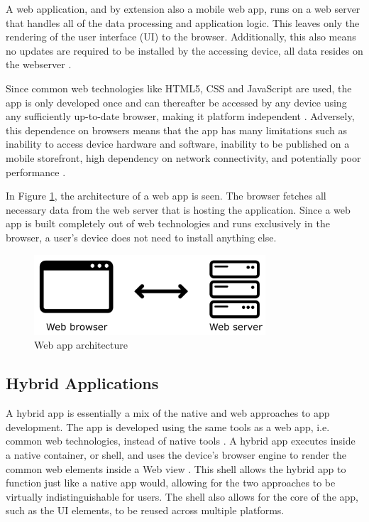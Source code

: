 \documentclass[a4paper,12pt]{article}
\begin{document}
A web application, and by extension also a mobile web app, runs on a web server that handles all of the data processing and application logic. This leaves only the rendering of the user interface (UI) to the browser. Additionally, this also means no updates are required to be installed by the accessing device, all data resides on the webserver \cite{crossplatform_taxonomy, crossplatform_2012}.

Since common web technologies like HTML5, CSS and JavaScript are used, the app is only developed once and can thereafter be accessed by any device using any sufficiently up-to-date browser, making it platform independent \cite{crossplatform_taxonomy}. Adversely, this dependence on browsers means that the app has many limitations such as  inability to access device hardware and software, inability to be published on a mobile storefront, high dependency on network connectivity, and potentially poor performance \cite{crossplatform_taxonomy, crossplatform_2012}.

In Figure \ref{fig:webapp}, the architecture of a web app is seen. The browser fetches all necessary data from the web server that is hosting the application. Since a web app is built completely out of web technologies and runs exclusively in the browser, a user’s device does not need to install anything else.

\begin{figure}[h]%
	\centering
	\includegraphics[height=3cm]{img/Other/struct_webapp.png}
	\caption{Web app architecture}%
	\label{fig:webapp}%
\end{figure}

\subsection{Hybrid Applications}
\label{Theory_hybridApps}
A hybrid app is essentially a mix of the native and web approaches to app development. The app is developed using the same tools as a web app, i.e. common web technologies, instead of native tools \cite{mobile_web_apps_2013}. A hybrid app executes inside a native container, or shell, and uses the device’s browser engine to render the common web elements inside a Web view \cite{crossplatform_2012}. This shell allows the hybrid app to function just like a native app would, allowing for the two approaches to be virtually indistinguishable for users. The shell also allows for the core of the app, such as the UI elements, to be reused across multiple platforms.
\end{document}
